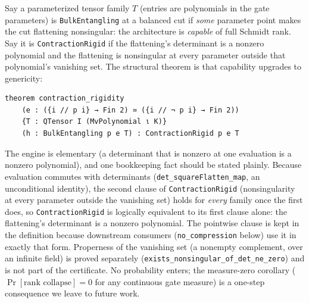 \documentclass[sigplan,10pt,screen,review,anonymous]{acmart}
\begin{document}
Say a parameterized tensor family $T$ (entries are polynomials in the gate parameters) is
\lstinline|BulkEntangling| at a balanced cut if \emph{some} parameter point makes the cut
flattening nonsingular: the architecture is \emph{capable} of full Schmidt rank. Say it
is \lstinline|ContractionRigid| if the flattening's determinant is a nonzero polynomial and
the flattening is nonsingular at every parameter outside that polynomial's vanishing set.
The structural theorem is that capability upgrades to genericity:

\begin{lstlisting}
theorem contraction_rigidity
    (e : ({i // p i} → Fin 2) ≃ ({i // ¬ p i} → Fin 2))
    {T : QTensor I (MvPolynomial ι K)}
    (h : BulkEntangling p e T) : ContractionRigid p e T
\end{lstlisting}

The engine is elementary (a determinant that is nonzero at one evaluation is a nonzero
polynomial), and one bookkeeping fact should be stated plainly. Because evaluation commutes
with determinants (\lstinline|det_squareFlatten_map|, an unconditional identity), the second
clause of \lstinline|ContractionRigid| (nonsingularity at every parameter outside the
vanishing set) holds for \emph{every} family once the first does, so
\lstinline|ContractionRigid| is logically equivalent to its first clause alone: the
flattening's determinant is a nonzero polynomial. The pointwise clause is kept in the
definition because downstream consumers (\lstinline|no_compression| below) use it in exactly
that form. Properness of the vanishing set (a nonempty complement, over an infinite field)
is proved separately (\lstinline|exists_nonsingular_of_det_ne_zero|) and is not part of
the certificate. No probability enters; the measure-zero corollary
($\Pr[\text{rank collapse}]=0$ for any continuous gate measure) is a one-step consequence we
leave to future work.
\end{document}
